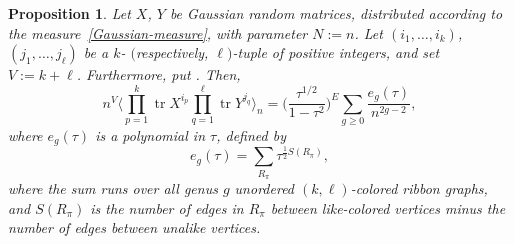 \documentclass[pdftex]{sigma}
\DeclareMathOperator{\tr}{tr}
\numberwithin{equation}{section}
\newtheorem{Proposition}[Theorem]{Proposition}
 { \theoremstyle{definition}
\newtheorem{Definition}[Theorem]{Definition}
\newtheorem{Note}[Theorem]{Note}
\newtheorem{Example}[Theorem]{Example}
\newtheorem{Remark}[Theorem]{Remark} }
\begin{document}
\begin{Proposition}
 Let $X$, $Y$ be Gaussian random matrices, distributed according to the measure~\eqref{Gaussian-measure}, with parameter $N := n$. Let
 $(i_1,\dots,i_k)$, $(j_1,\dots,j_\ell)$ be a $k$- $($respectively, $\ell)$-tuple of positive integers, and set $V := k+\ell$. Furthermore, put
 . Then,
 \begin{equation*}
 n^{V}\Biggl\langle \prod_{p=1}^k \tr X^{i_p}\prod_{q = 1}^\ell \tr Y^{j_q}\Biggr\rangle_n
 = \biggl(\frac{\tau^{1/2}}{1-\tau^2}\biggr)^E\sum_{g\geq 0} \frac{e_g(\tau)}{n^{2g-2}},
 \end{equation*}
 where $e_g(\tau)$ is a polynomial in $\tau$, defined by
 \begin{equation*}
 e_g(\tau) = \sum_{R_{\pi} } \tau^{\frac{1}{2}S(R_{\pi})},
 \end{equation*}
 where the sum runs over all genus $g$ unordered $(k,\ell)$-colored ribbon graphs, and $S(R_{\pi})$ is the number of edges in $R_{\pi}$ between
 like-colored vertices minus the number of edges between unalike vertices.
\end{Proposition}
\end{document}
